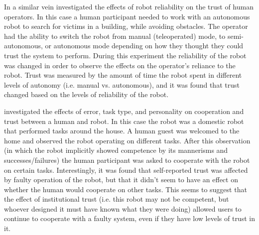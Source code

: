 In a similar vein \citet{Desai2012-rc} investigated the effects of robot reliability on the trust of human operators. In this case a human participant needed to work with an autonomous robot to search for victims in a building, while avoiding obstacles. The operator had the ability to switch the robot from manual (teleoperated) mode, to semi-autonomous, or autonomous mode depending on how they thought they could trust the system to perform. During this experiment the reliability of the robot was changed in order to observe the effects on the operator's reliance to the robot. Trust was measured by the amount of time the robot spent in different levels of autonomy (i.e. manual vs. autonomous), and it was found that trust changed based on the levels of reliability of the robot.

\citet{Salem2015-md} investigated the effects of error, task type, and personality on cooperation and trust between a human and robot. In this case the robot was a domestic robot that performed tasks around the house. A human guest was welcomed to the home and observed the robot operating on different tasks. After this observation (in which the robot implicitly showed competence by its mannerisms and successes/failures) the human participant was asked to cooperate with the robot on certain tasks. Interestingly, it was found that self-reported trust was affected by faulty operation of the robot, but that it didn't seem to have an effect on whether the human would cooperate on other tasks.  This seems to suggest that the effect of institutional trust (i.e. this robot may not be competent, but whoever designed it must have known what they were doing) allowed users to continue to cooperate with a faulty system, even if they have low levels of trust in it. 

